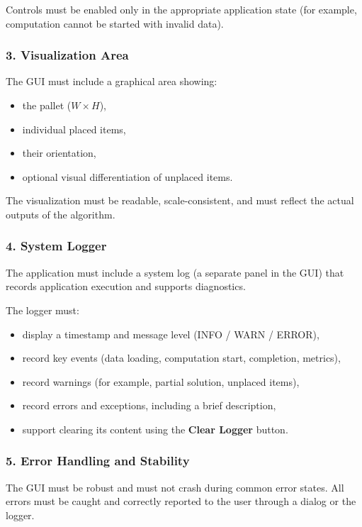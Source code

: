\documentclass[12pt,a4paper]{article}
\begin{document}
Controls must be enabled only in the appropriate application state
(for example, computation cannot be started with invalid data).

\subsubsection*{3. Visualization Area}

The GUI must include a graphical area showing:

\begin{itemize}
    \item the pallet ($W \times H$),
    \item individual placed items,
    \item their orientation,
    \item optional visual differentiation of unplaced items.
\end{itemize}

The visualization must be readable, scale-consistent,
and must reflect the actual outputs of the algorithm.

\subsubsection*{4. System Logger}

The application must include a system log (a separate panel in the GUI)
that records application execution and supports diagnostics.

The logger must:

\begin{itemize}
    \item display a timestamp and message level (INFO / WARN / ERROR),
    \item record key events (data loading, computation start, completion, metrics),
    \item record warnings (for example, partial solution, unplaced items),
    \item record errors and exceptions, including a brief description,
    \item support clearing its content using the \textbf{Clear Logger} button.
\end{itemize}

\subsubsection*{5. Error Handling and Stability}

The GUI must be robust and must not crash during common error states.
All errors must be caught and correctly reported
to the user through a dialog or the logger.
\end{document}
